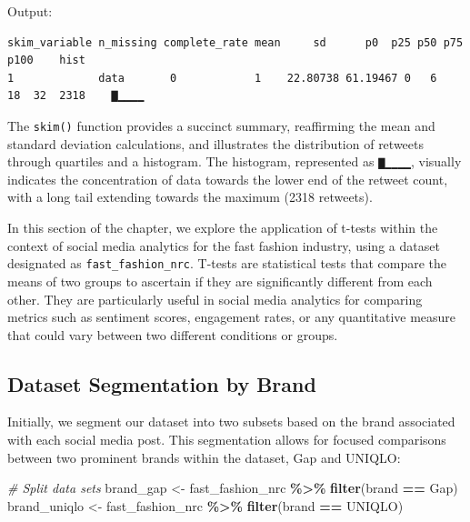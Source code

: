 \documentclass[
]{book}
\newenvironment{Shaded}{\begin{snugshade}}{\end{snugshade}}
\newcommand{\CommentTok}[1]{\textcolor[rgb]{0.56,0.35,0.01}{\textit{#1}}}
\newcommand{\FunctionTok}[1]{\textcolor[rgb]{0.13,0.29,0.53}{\textbf{#1}}}
\newcommand{\NormalTok}[1]{#1}
\newcommand{\OtherTok}[1]{\textcolor[rgb]{0.56,0.35,0.01}{#1}}
\newcommand{\SpecialCharTok}[1]{\textcolor[rgb]{0.81,0.36,0.00}{\textbf{#1}}}
\newcommand{\StringTok}[1]{\textcolor[rgb]{0.31,0.60,0.02}{#1}}
\begin{document}
\begin{Shaded}
\end{Shaded}

Output:

\begin{verbatim}
skim_variable n_missing complete_rate mean     sd      p0  p25 p50 p75 p100    hist
1             data       0            1    22.80738 61.19467 0   6   18  32  2318    ▇▁▁▁▁
\end{verbatim}

The \texttt{skim()} function provides a succinct summary, reaffirming the mean and standard deviation calculations, and illustrates the distribution of retweets through quartiles and a histogram. The histogram, represented as \texttt{▇▁▁▁▁}, visually indicates the concentration of data towards the lower end of the retweet count, with a long tail extending towards the maximum (2318 retweets).

In this section of the chapter, we explore the application of t-tests within the context of social media analytics for the fast fashion industry, using a dataset designated as \texttt{fast\_fashion\_nrc}. T-tests are statistical tests that compare the means of two groups to ascertain if they are significantly different from each other. They are particularly useful in social media analytics for comparing metrics such as sentiment scores, engagement rates, or any quantitative measure that could vary between two different conditions or groups.

\hypertarget{dataset-segmentation-by-brand}{%
\subsection{Dataset Segmentation by Brand}\label{dataset-segmentation-by-brand}}

Initially, we segment our dataset into two subsets based on the brand associated with each social media post. This segmentation allows for focused comparisons between two prominent brands within the dataset, Gap and UNIQLO:

\begin{Shaded}
\begin{Highlighting}[]
\CommentTok{\# Split data sets}
\NormalTok{brand\_gap }\OtherTok{\textless{}{-}}\NormalTok{ fast\_fashion\_nrc }\SpecialCharTok{\%\textgreater{}\%} \FunctionTok{filter}\NormalTok{(brand }\SpecialCharTok{==} \StringTok{\textquotesingle{}Gap\textquotesingle{}}\NormalTok{)}
\NormalTok{brand\_uniqlo }\OtherTok{\textless{}{-}}\NormalTok{ fast\_fashion\_nrc }\SpecialCharTok{\%\textgreater{}\%} \FunctionTok{filter}\NormalTok{(brand }\SpecialCharTok{==} \StringTok{\textquotesingle{}UNIQLO\textquotesingle{}}\NormalTok{)}
\end{Highlighting}
\end{Shaded}
\end{document}
